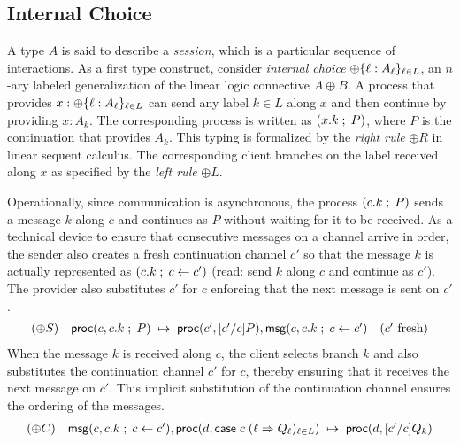 \subsection*{Internal Choice}
A type $A$ is said to describe a \emph{session}, which is a particular
sequence of interactions. As a first type construct, consider \emph{internal
choice} $\oplus \{ \ell : A_\ell \}_{\ell \in L}$, an $n$-ary labeled
generalization of the linear logic connective $A \oplus B$. A process
that provides $x : \oplus \{ \ell : A_\ell \}_{\ell \in L}$ can send any label
$k \in L$ along $x$ and then continue by providing $x : A_k$. The
corresponding process is written as $(x.k \; ; \; P)$, where
$P$ is the continuation that provides $A_k$. This typing is formalized
by the \emph{right rule} $\oplus R$ in linear sequent calculus. The
corresponding client branches on the label received along $x$ as specified
by the \emph{left rule} $\oplus L$.

Operationally, since communication is asynchronous, the process
$(c.k \; ; \; P)$ sends a message $k$
along $c$ and continues as $P$ without waiting for it to be received.
As a technical device to ensure that consecutive messages on a
channel arrive in order, the sender also creates a fresh continuation
channel $c'$ so that the message $k$ is actually represented as
$(c.k \; ; \; c \leftarrow c')$ (read: send $k$ along $c$ and
continue as $c'$). The provider also substitutes $c'$ for $c$ enforcing
that the next message is sent on $c'$.
\[
\begin{array}{lll}
(\oplus S) & \mathsf{proc}(c, c.k \; ; \; P) \; \mapsto \; \mathsf{proc}(c', [c'/c]P),
\mathsf{msg}(c, c.k \; ; \; c \leftarrow c') & (c' \text{ fresh})
\end{array}
\]
When the message $k$ is received along $c$, the client selects branch
$k$ and also substitutes the continuation channel $c'$ for $c$, thereby
ensuring that it receives the next message on $c'$. This implicit
substitution of the continuation channel ensures the ordering of the
messages.
\[
\begin{array}{ll}
(\oplus C) & \mathsf{msg}(c, c.k \; ; \; c \leftarrow c'),
\mathsf{proc}(d, \mathsf{case} \; c \; (\ell \Rightarrow Q_\ell)_{\ell \in L}) \; \mapsto \; \mathsf{proc}(d, [c'/c]Q_k)
\end{array}
\]

